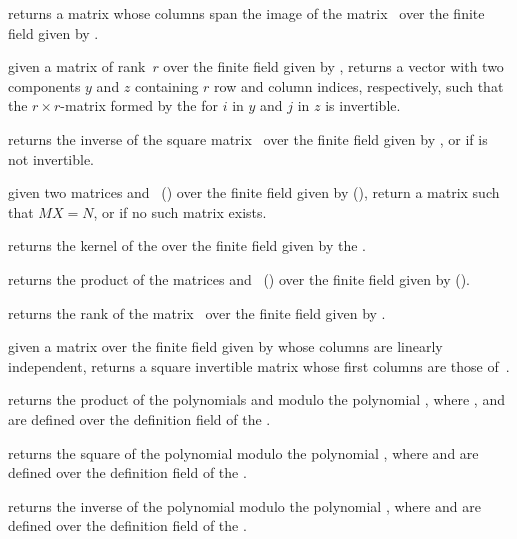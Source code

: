  returns a matrix whose columns
span the image of the matrix~ over the finite field given by
.

 given a matrix  of
rank~$r$ over the finite field given by , returns a vector
with two  components $y$ and $z$ containing $r$ row and
column indices, respectively, such that the $r\times r$-matrix formed
by the  for $i$ in $y$ and $j$ in $z$ is invertible.

 returns the inverse of the square
matrix~ over the finite field given by , or 
if  is not invertible.

 given two matrices
 and~ () over the finite field given by
 (), return a matrix  such that $MX=N$, or
 if no such matrix exists.

 returns the kernel of the 
 over the finite field given by the  .

 returns the product of the
matrices  and~ () over the finite field given
by  ().

 returns the rank of the
matrix~ over the finite field given by .

 given a matrix  over the
finite field given by  whose columns are linearly independent,
returns a square invertible matrix whose first columns are those
of~.


 returns the product
of the polynomials  and  modulo the polynomial , where
,  and  are defined over the definition field of the
 .

 returns the square
of the polynomial  modulo the polynomial , where  and
 are defined over the definition field of the  .

 returns the inverse
of the polynomial  modulo the polynomial , where  and
 are defined over the definition field of the  .

